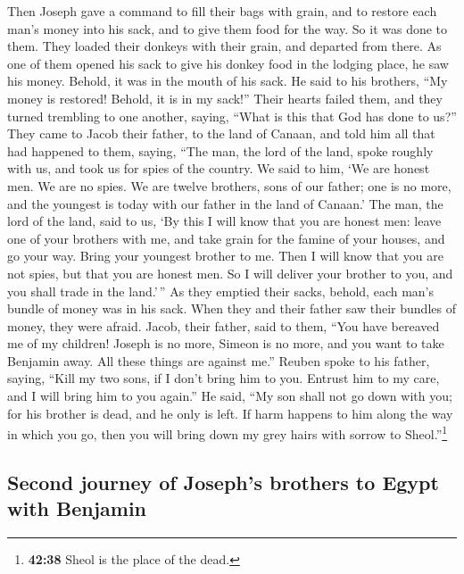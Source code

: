  Then Joseph gave a command to fill their bags with
grain, and to restore each man's money into his sack, and to give them
food for the way. So it was done to them.  They loaded
their donkeys with their grain, and departed from there. 
As one of them opened his sack to give his donkey food in the lodging
place, he saw his money. Behold, it was in the mouth of his sack.
 He said to his brothers, ``My money is restored! Behold,
it is in my sack!'' Their hearts failed them, and they turned trembling
to one another, saying, ``What is this that God has done to us?''
 They came to Jacob their father, to the land of Canaan,
and told him all that had happened to them, saying, 
``The man, the lord of the land, spoke roughly with us, and took us for
spies of the country.  We said to him, `We are honest
men. We are no spies.  We are twelve brothers, sons of
our father; one is no more, and the youngest is today with our father in
the land of Canaan.'  The man, the lord of the land, said
to us, `By this I will know that you are honest men: leave one of your
brothers with me, and take grain for the famine of your houses, and go
your way.  Bring your youngest brother to me. Then I will
know that you are not spies, but that you are honest men. So I will
deliver your brother to you, and you shall trade in the land.'\,''
 As they emptied their sacks, behold, each man's bundle
of money was in his sack. When they and their father saw their bundles
of money, they were afraid.  Jacob, their father, said to
them, ``You have bereaved me of my children! Joseph is no more, Simeon
is no more, and you want to take Benjamin away. All these things are
against me.''  Reuben spoke to his father, saying, ``Kill
my two sons, if I don't bring him to you. Entrust him to my care, and I
will bring him to you again.''  He said, ``My son shall
not go down with you; for his brother is dead, and he only is left. If
harm happens to him along the way in which you go, then you will bring
down my grey hairs with sorrow to Sheol.''\footnote{\textbf{42:38} Sheol
  is the place of the dead.}

\hypertarget{second-journey-of-josephs-brothers-to-egypt-with-benjamin}{%
\subsection{Second journey of Joseph's brothers to Egypt with
Benjamin}\label{second-journey-of-josephs-brothers-to-egypt-with-benjamin}}

